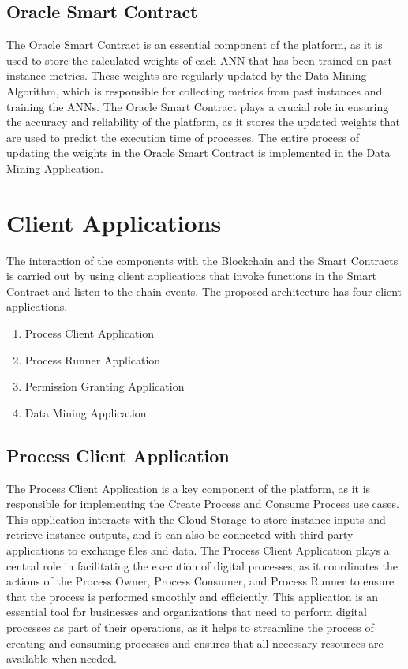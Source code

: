 \documentclass[10pt,a4paper]{report}
\begin{document}
\subsection{Oracle Smart Contract}
\large\justify The Oracle Smart Contract is an essential component of the platform, as it is used to store the calculated weights of each ANN that has been trained on past instance metrics. These weights are regularly updated by the Data Mining Algorithm, which is responsible for collecting metrics from past instances and training the ANNs. The Oracle Smart Contract plays a crucial role in ensuring the accuracy and reliability of the platform, as it stores the updated weights that are used to predict the execution time of processes. The entire process of updating the weights in the Oracle Smart Contract is implemented in the Data Mining Application.

\section{Client Applications}
\large\justify The interaction of the components with the Blockchain and the Smart Contracts is carried out by using client applications that invoke functions in the Smart Contract and listen to the chain events. The proposed architecture has four client applications.
\begin{enumerate}
    \item Process Client Application
    \item Process Runner Application
    \item Permission Granting Application
    \item Data Mining Application
\end{enumerate}

\subsection{Process Client Application}
\large\justify The Process Client Application is a key component of the platform, as it is responsible for implementing the Create Process and Consume Process use cases. This application interacts with the Cloud Storage to store instance inputs and retrieve instance outputs, and it can also be connected with third-party applications to exchange files and data. The Process Client Application plays a central role in facilitating the execution of digital processes, as it coordinates the actions of the Process Owner, Process Consumer, and Process Runner to ensure that the process is performed smoothly and efficiently. This application is an essential tool for businesses and organizations that need to perform digital processes as part of their operations, as it helps to streamline the process of creating and consuming processes and ensures that all necessary resources are available when needed.
\end{document}
